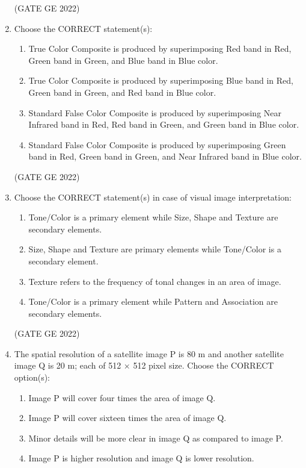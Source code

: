 \documentclass[a4paper, 11pt]{article}
\begin{document}
\begin{enumerate}
\hfill (GATE GE 2022)

\item Choose the CORRECT statement(s):
\begin{enumerate}
    \item True Color Composite is produced by superimposing Red band in Red, Green band in Green, and Blue band in Blue color.
    \item True Color Composite is produced by superimposing Blue band in Red, Green band in Green, and Red band in Blue color.
    \item Standard False Color Composite is produced by superimposing Near Infrared band in Red, Red band in Green, and Green band in Blue color.
    \item Standard False Color Composite is produced by superimposing Green band in Red, Green band in Green, and Near Infrared band in Blue color.
\end{enumerate}

\hfill (GATE GE 2022)

\item Choose the CORRECT statement(s) in case of visual image interpretation:
\begin{enumerate}
    \item Tone/Color is a primary element while Size, Shape and Texture are secondary elements.
    \item Size, Shape and Texture are primary elements while Tone/Color is a secondary element.
    \item Texture refers to the frequency of tonal changes in an area of image.
    \item Tone/Color is a primary element while Pattern and Association are secondary elements.
\end{enumerate}

\hfill (GATE GE 2022)

\item The spatial resolution of a satellite image P is 80 m and another satellite image Q is 20 m; each of 512 × 512 pixel size. Choose the CORRECT option(s):
\begin{enumerate}
    \item Image P will cover four times the area of image Q.
    \item Image P will cover sixteen times the area of image Q.
    \item Minor details will be more clear in image Q as compared to image P.
    \item Image P is higher resolution and image Q is lower resolution.
\end{enumerate}


\end{enumerate}
\end{document}
